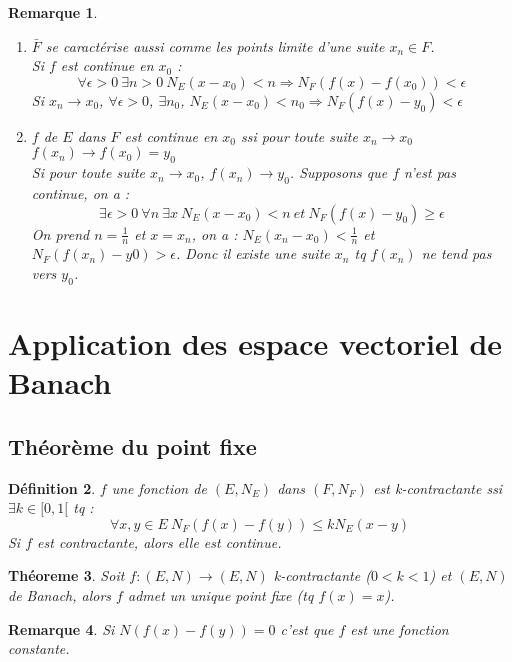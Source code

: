 \documentclass[a4paper, oneside]{report}
\theoremstyle{break}
\newtheorem{thm}{Théoreme}[section] %
\newtheorem{defi}[thm]{Définition}
\newtheorem{remar}[thm]{Remarque}
\newcommand{\ev}{espace vectoriel }
\newcommand{\fracun}[1]{\frac{1}{#1}}
\begin{document}
\begin{remar}
\begin{enumerate}
\item $\bar{F}$ se caractérise aussi comme les points limite d'une suite $x_n\in F$.\\

Si $f$ est continue en $x_0$ :
$$\forall \epsilon >0~\exists n>0~N_E(x-x_0)<n\Rightarrow N_F(f(x)-f(x_0)) < \epsilon$$
Si $x_n\rightarrow x_0$, $\forall \epsilon>0$, $\exists n_0$, $N_E(x-x_0)<n_0\Rightarrow N_F(f(x)-y_0) < \epsilon$

\item $f$ de $E$ dans $F$ est continue en $x_0$ ssi pour toute suite $x_n\rightarrow x_0$ $f(x_n)\rightarrow f(x_0)=y_0$\\

Si pour toute suite $x_n\rightarrow x_0$, $f(x_n)\rightarrow y_0$. Supposons que $f$ n'est pas continue, on a :
$$\exists \epsilon >0~\forall n~\exists x~ N_E(x-x_0)<n~et~N_F(f(x)-y_0)\geq \epsilon$$
On prend $n=\fracun{n}$ et $x=x_n$, on a : $N_E(x_n-x_0)<\fracun{n}$ et $N_F(f(x_n)-y0)>\epsilon$. Donc il existe une suite $x_n$ tq $f(x_n)$ ne tend pas vers $y_0$.

\end{enumerate}
\end{remar}


\section{Application des \ev de Banach}

\subsection{Théorème du point fixe}

\begin{defi}
$f$ une fonction de $(E,N_E)$ dans $(F,N_F)$ est k-contractante ssi $\exists k\in [0,1[$ tq :
$$\forall x,y\in E~N_F(f(x)-f(y))\leq kN_E(x-y)$$
Si $f$ est contractante, alors elle est continue.
\end{defi}

\begin{thm}
Soit $f:(E,N) \rightarrow (E,N)$ k-contractante ($0< k<1$) et $(E,N)$ de Banach, alors $f$ admet un unique point fixe (tq $f(x)=x$).
\end{thm}



\begin{remar}
Si $N(f(x)-f(y))=0$ c'est que $f$ est une fonction constante.
\end{remar}
\end{document}
